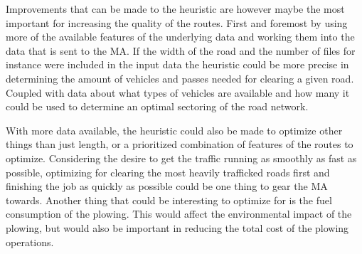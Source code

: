Improvements that can be made to the heuristic are however maybe the most important for increasing the quality of the routes. First and foremost by using more of the available features of the underlying data and working them into the data that is sent to the MA. If the width of the road and the number of files for instance were included in the input data the heuristic could be more precise in determining the amount of vehicles and passes needed for clearing a given road. Coupled with data about what types of vehicles are available and how many it could be used to determine an optimal sectoring of the road network.

With more data available, the heuristic could also be made to optimize other things than just length, or a prioritized combination of features of the routes to optimize. Considering the desire to get the traffic running as smoothly as fast as possible, optimizing for clearing the most heavily trafficked roads first and finishing the job as quickly as possible could be one thing to gear the MA towards. Another thing that could be interesting to optimize for is the fuel consumption of the plowing. This would affect the environmental impact of the plowing, but would also be important in reducing the total cost of the plowing operations.




\cleardoublepage
